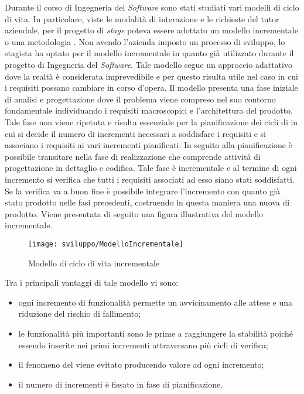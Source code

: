 Durante il corso di Ingegneria del \textit{Software} sono stati studiati vari modelli di ciclo di vita. In particolare, viste le modalità di interazione e le richieste del tutor aziendale, per il progetto di \textit{stage} poteva essere adottato un modello incrementale o una metodologia . Non avendo l'azienda imposto un processo di sviluppo, lo stagista ha optato per il modello incrementale in quanto già utilizzato durante il progetto di Ingegneria del \textit{Software}. Tale modello segue un approccio adattativo dove la realtà è considerata imprevedibile e per questo risulta utile nel caso in cui i requisiti possano cambiare in corso d'opera. Il modello presenta una fase iniziale di analisi e progettazione dove il problema viene compreso nel suo contorno fondamentale individuando i requisiti macroscopici e l'architettura del prodotto. Tale fase non viene ripetuta e risulta essenziale per la pianificazione dei cicli di  in cui si decide il numero di incrementi necessari a soddisfare i requisiti e si associano i requisiti ai vari incrementi pianificati. In seguito alla pianificazione è possibile transitare nella fase di realizzazione che comprende attività di progettazione in dettaglio e codifica. Tale fase è incrementale e al termine di ogni incremento si verifica che tutti i requisiti associati ad esso siano stati soddisfatti. Se la verifica va a buon fine è possibile integrare l'incremento con quanto già stato prodotto nelle fasi precedenti, costruendo in questa maniera una nuova  di prodotto. Viene presentata di seguito una figura illustrativa del modello incrementale.

\begin{figure}[!h] 
    \centering 
    \texttt{[image: sviluppo/ModelloIncrementale]} 
    \caption{Modello di ciclo di vita incrementale}
\end{figure}

Tra i principali vantaggi di tale modello vi sono:
\begin{itemize}
	\item ogni incremento di funzionalità permette un avvicinamento alle attese e una riduzione del rischio di fallimento;
	\item le funzionalità più importanti sono le prime a raggiungere la stabilità poiché essendo inserite nei primi incrementi attraversano più cicli di verifica;
	\item il fenomeno del  viene evitato producendo valore ad ogni incremento;
	\item il numero di incrementi è fissato in fase di pianificazione.
\end{itemize}

